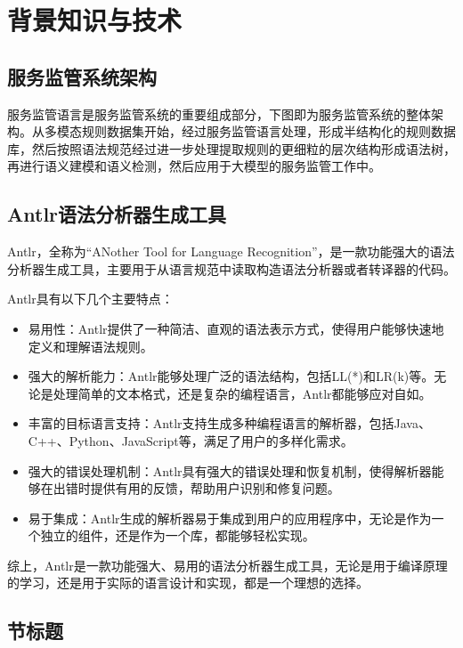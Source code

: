 \cleardoublepage

\section{背景知识与技术}

\subsection{服务监管系统架构}

服务监管语言是服务监管系统的重要组成部分，下图即为服务监管系统的整体架构。从多模态规则数据集开始，经过服务监管语言处理，形成半结构化的规则数据库，然后按照语法规范经过进一步处理提取规则的更细粒的层次结构形成语法树，再进行语义建模和语义检测，然后应用于大模型的服务监管工作中。

\subsection{Antlr语法分析器生成工具}

Antlr，全称为“ANother Tool for Language Recognition”，是一款功能强大的语法分析器生成工具，主要用于从语言规范中读取构造语法分析器或者转译器的代码。

Antlr具有以下几个主要特点：

\begin{itemize}
    \item 易用性：Antlr提供了一种简洁、直观的语法表示方式，使得用户能够快速地定义和理解语法规则。
    \item 强大的解析能力：Antlr能够处理广泛的语法结构，包括LL(*)和LR(k)等。无论是处理简单的文本格式，还是复杂的编程语言，Antlr都能够应对自如。
    \item 丰富的目标语言支持：Antlr支持生成多种编程语言的解析器，包括Java、C++、Python、JavaScript等，满足了用户的多样化需求。
    \item 强大的错误处理机制：Antlr具有强大的错误处理和恢复机制，使得解析器能够在出错时提供有用的反馈，帮助用户识别和修复问题。
    \item 易于集成：Antlr生成的解析器易于集成到用户的应用程序中，无论是作为一个独立的组件，还是作为一个库，都能够轻松实现。
\end{itemize}

综上，Antlr是一款功能强大、易用的语法分析器生成工具，无论是用于编译原理的学习，还是用于实际的语言设计和实现，都是一个理想的选择。

\subsection{节标题}

